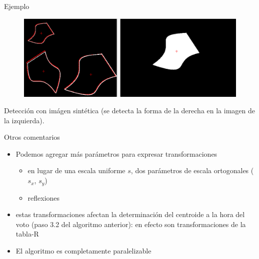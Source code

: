 \documentclass{beamer}
\begin{document}
\begin{frame}{Ejemplo}
\begin{figure}
    \centering
    \includegraphics[scale=0.5]{ejemplo-sintetico}
    \label{fig:my_label}
\end{figure}
Detección con imágen sintética (se detecta la forma de la derecha en la imagen de la izquierda).
\end{frame}
\begin{frame}{Otros comentarios}
\begin{itemize}
    \item Podemos agregar más parámetros para expresar transformaciones
    \begin{itemize}
        \item en lugar de una escala uniforme $s$, dos parámetros de escala ortogonales ($s_x$, $s_y$)
        \item reflexiones
    \end{itemize}
    \item estas transformaciones afectan la determinación del centroide a la hora del voto (paso 3.2 del algoritmo anterior): en efecto son transformaciones de la tabla-R 
    \item El algoritmo es completamente paralelizable
\end{itemize}
\end{frame}

\end{document}
